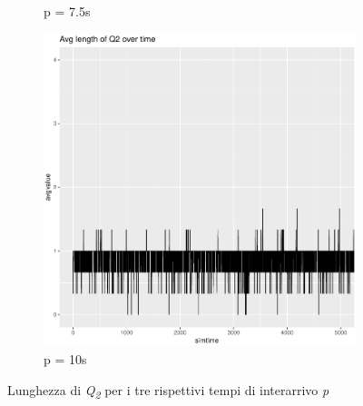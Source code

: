 \documentclass[a4paper,11pt]{article}
\begin{document}
\begin{figure}[h!]
\begin{subfigure}{.5\textwidth}
  \caption{p = 7.5s}
  \label{fig:sfig2}
\end{subfigure}
\begin{subfigure}{\textwidth}
  \centering
  \includegraphics[width=.45\linewidth]{images/chart-q2avglength-10.png}
  \caption{p = 10s}
  \label{fig:sfig2}
\end{subfigure}
\caption{Lunghezza di \textit{Q\textsubscript{2}} per i tre rispettivi tempi di interarrivo \textit{p}}
\label{fig:fig}
\end{figure}
\newpage
\end{document}
